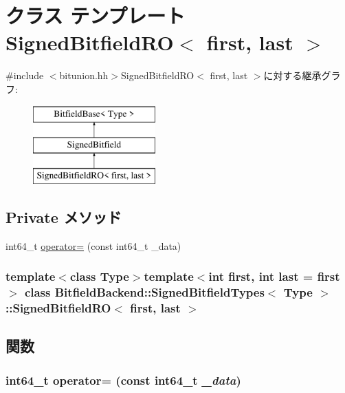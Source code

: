 \hypertarget{classBitfieldBackend_1_1SignedBitfieldTypes_1_1SignedBitfieldRO}{
\section{クラス テンプレート SignedBitfieldRO$<$ first, last $>$}
\label{classBitfieldBackend_1_1SignedBitfieldTypes_1_1SignedBitfieldRO}
}


{\ttfamily \#include $<$bitunion.hh$>$}SignedBitfieldRO$<$ first, last $>$に対する継承グラフ:\begin{figure}[H]
\begin{center}
\leavevmode
\includegraphics[height=3cm]{classBitfieldBackend_1_1SignedBitfieldTypes_1_1SignedBitfieldRO}
\end{center}
\end{figure}
\subsection*{Private メソッド}
\begin{DoxyCompactItemize}
\item 
int64\_\-t \hyperlink{classBitfieldBackend_1_1SignedBitfieldTypes_1_1SignedBitfieldRO_aa9c1202c4f5162c5214e708c80d5d4c8}{operator=} (const int64\_\-t \_\-data)
\end{DoxyCompactItemize}
\subsubsection*{template$<$class Type$>$template$<$int first, int last = first$>$ class BitfieldBackend::SignedBitfieldTypes$<$ Type $>$::SignedBitfieldRO$<$ first, last $>$}



\subsection{関数}
\hypertarget{classBitfieldBackend_1_1SignedBitfieldTypes_1_1SignedBitfieldRO_aa9c1202c4f5162c5214e708c80d5d4c8}{
\subsubsection[{operator=}]{\setlength{\rightskip}{0pt plus 5cm}int64\_\-t operator= (const int64\_\-t {\em \_\-data})}}
\label{classBitfieldBackend_1_1SignedBitfieldTypes_1_1SignedBitfieldRO_aa9c1202c4f5162c5214e708c80d5d4c8}


